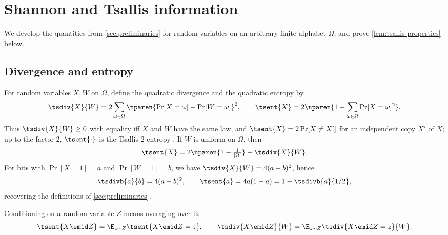 \section{Shannon and Tsallis information}
\label{sec:quadi}
\iffalse
We develop the quantities from \autoref{sec:preliminaries}
for random variables on an arbitrary finite alphabet $\Omega$,
and prove \autoref{lem:tsallis-properties} below.

\subsection*{Divergence and entropy}
For random variables $X,W$ on $\Omega$, define the quadratic
divergence and the quadratic entropy by
\begin{equation*}
  \tsdiv{X}{W}
  =2\sum_{\omega\in\Omega}\nparen{\Pr[X=\omega]-\Pr[W=\omega]}^2,
  \qquad
  \tsent{X}=2\nparen{1-\sum_{\omega\in\Omega}\Pr[X=\omega]^2}.
\end{equation*}
Thus $\tsdiv{X}{W}\ge0$ with equality iff $X$ and $W$ have the
same law, and $\tsent{X}=2\Pr[X\ne X']$ for an independent copy
$X'$ of $X$; up to the factor $2$, $\tsent{\cdot}$ is the Tsallis
$2$-entropy \cite{Tsallis1988}. If $W$ is uniform on $\Omega$,
then
\begin{equation*}
  \tsent{X}=2\nparen{1-\tfrac1{|\Omega|}}-\tsdiv{X}{W}.
\end{equation*}
For bits with $\Pr[X=1]=a$ and $\Pr[W=1]=b$, we have
$\tsdiv{X}{W}=4(a-b)^2$, hence
\begin{equation*}
  \tsdivb{a}{b}=4(a-b)^2,
  \qquad
  \tsent{a}=4a(1-a)=1-\tsdivb{a}{1/2},
\end{equation*}
recovering the definitions of \autoref{sec:preliminaries}.

Conditioning on a random variable $Z$ means averaging over it:
\begin{equation*}
  \tsent{X\emid Z}=\E_{z\sim Z}\tsent{X\emid Z=z},
  \qquad
  \tsdiv{X\emid Z}{W}=\E_{z\sim Z}\tsdiv{X\emid Z=z}{W}.
\end{equation*}

